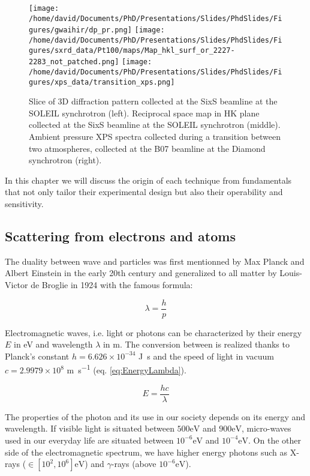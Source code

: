 \begin{figure}[!htb]
    \centering
    \texttt{[image: /home/david/Documents/PhD/Presentations/Slides/PhdSlides/Figures/gwaihir/dp\_pr.png]}
    \texttt{[image: /home/david/Documents/PhD/Presentations/Slides/PhdSlides/Figures/sxrd\_data/Pt100/maps/Map\_hkl\_surf\_or\_2227-2283\_not\_patched.png]}
    \texttt{[image: /home/david/Documents/PhD/Presentations/Slides/PhdSlides/Figures/xps\_data/transition\_xps.png]}
    \caption{Slice of 3D diffraction pattern collected at the SixS beamline at the SOLEIL synchrotron (left). Reciprocal space map in HK plane collected at the SixS beamline at the SOLEIL synchrotron (middle). Ambient pressure XPS spectra collected during a transition between two atmospheres, collected at the B07 beamline at the Diamond synchrotron (right).}
\end{figure}


In this chapter we will discuss the origin of each technique from fundamentals that not only tailor their experimental design but also their operability and sensitivity.

\subsection{Scattering from electrons and atoms}

The duality between wave and particles was first mentionned by Max Planck and Albert Einstein in the early 20th century and generalized to all matter by Louis-Victor de Broglie in 1924 with the famous formula:

\begin{equation}
	\lambda = \frac{h}{p}
\end{equation}

Electromagnetic waves, i.e. light or photons can be characterized by their energy $E$ in \si{\electronvolt} and wavelength $\lambda$ in \si{\meter}.
The conversion between is realized thanks to Planck's constant $h = 6.626 \times 10^{-34}$ \si{\joule \second} and the speed of light in vacuum $c = 2.9979 \times 10^{8}$ \si{\meter \per \second} (eq. \ref{eq:EnergyLambda}).

\begin{equation}
    \label{eq:EnergyLambda}
	E = \frac{hc}{\lambda}
\end{equation}

The properties of the photon and its use in our society depends on its energy and wavelength.
If visible light is situated between $500 \si{\electronvolt}$ and $900 \si{\electronvolt}$, micro-waves used in our everyday life are situated between $10^{-6} \si{\electronvolt}$ and $10^{-4}\si{\electronvolt}$.
On the other side of the electromagnetic spectrum, we have higher energy photons such as X-rays ($\in [10^{2}, 10^{6}] \si{\electronvolt}$) and $\gamma$-rays (above $10^{-6} \si{\electronvolt}$).

